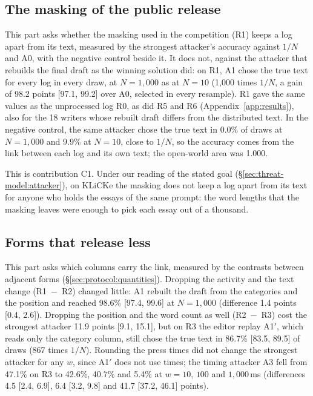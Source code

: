 \subsection{The masking of the public release}
\label{sec:results:masking}

This part asks whether the masking used in the competition (R1) keeps a log apart from its text, measured by the
strongest attacker's accuracy against $1/N$ and A0, with the negative control beside it. It does not, against the attacker that rebuilds the final draft as the winning solution did: on R1, A1 chose the
true text for every log in every draw, at $N = 1{,}000$ as at $N = 10$ (1,000 times $1/N$, a gain of 98.2 points
[97.1, 99.2] over A0, selected in every resample). R1 gave the same values as the unprocessed log R0, as did R5 and R6
(Appendix~\ref{app:results}), also for the 18 writers whose rebuilt draft differs from the distributed text. In the negative
control, the same attacker chose the true text in 0.0\% of draws at $N = 1{,}000$ and 9.9\% at $N = 10$, close to
$1/N$, so the accuracy comes from the link between each log and its own text; the open-world area was 1.000.

This is contribution C1. Under our reading of the stated goal (\S\ref{sec:threat-model:attacker}), on KLiCKe the masking
does not keep a log apart from its text for anyone who holds the essays of the same prompt: the word lengths that the
masking leaves were enough to pick each essay out of a thousand.

\subsection{Forms that release less}
\label{sec:results:forms}

This part asks which columns carry the link, measured by the contrasts between adjacent forms
(\S\ref{sec:protocol:quantities}). Dropping the activity and the text change (R1~$-$~R2) changed little: A1 rebuilt
the draft from the categories and the position and reached 98.6\% [97.4, 99.6] at $N = 1{,}000$ (difference 1.4
points [0.4, 2.6]). Dropping the position and the word count as well (R2~$-$~R3) cost the strongest attacker 11.9
points [9.1, 15.1], but on R3 the editor replay A1$'$, which reads only the category column, still chose the true text
in 86.7\% [83.5, 89.5] of draws (867 times $1/N$). Rounding the press times did not change the strongest attacker for
any $w$, since A1$'$ does not use times; the timing attacker A3 fell from 47.1\% on R3 to 42.6\%, 40.7\% and 5.4\% at
$w = 10$, $100$ and $1{,}000$\,ms (differences 4.5 [2.4, 6.9], 6.4 [3.2, 9.8] and 41.7 [37.2, 46.1] points).

